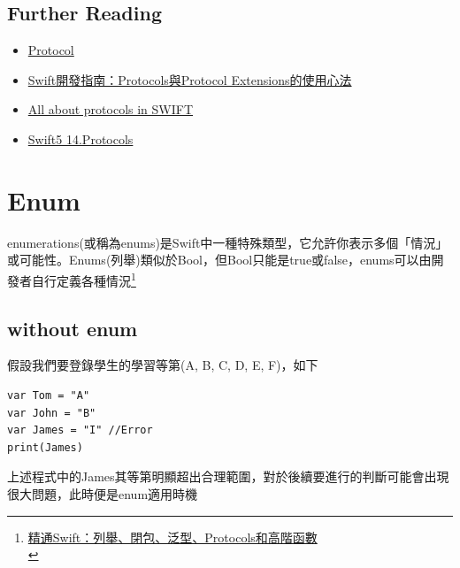 \documentclass[a4paper,12pt]{article}
\begin{document}
\subsection{Further Reading}
\label{sec:org99a45d3}
\begin{itemize}
\item \href{https://docs.swift.org/swift-book/LanguageGuide/Protocols.html}{Protocol}\\
\item \href{https://appcoda.com.tw/swift-protocol/}{Swift開發指南：Protocols與Protocol Extensions的使用心法}\\
\item \href{https://abhimuralidharan.medium.com/all-about-protocols-in-swift-11a72d6ea354}{All about protocols in SWIFT}\\
\item \href{https://blog.csdn.net/XunCiy/article/details/107367571}{Swift5 14.Protocols}\\
\end{itemize}

\newpage

\section{Enum}
\label{SW-enum}
enumerations(或稱為enums)是Swift中一種特殊類型，它允許你表示多個「情況」或可能性。Enums(列舉)類似於Bool，但Bool只能是true或false，enums可以由開發者自行定義各種情況\footnote{\href{https://appcoda.com.tw/mastering-swift/}{精通Swift：列舉、閉包、泛型、Protocols和高階函數}\\}\\

\subsection{without enum}
\label{sec:org786e6b8}
假設我們要登錄學生的學習等第(A, B, C, D, E, F)，如下\\
\lstset{breaklines=true,language=swift,label= ,caption= ,captionpos=b,firstnumber=1,numbers=left}
\begin{lstlisting}
var Tom = "A"
var John = "B"
var James = "I" //Error
print(James)
\end{lstlisting}

上述程式中的James其等第明顯超出合理範圍，對於後續要進行的判斷可能會出現很大問題，此時便是enum適用時機\\
\end{document}
